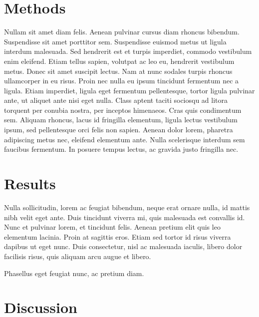\section{Methods}
\label{sec:studytwo:methods}

Nullam sit amet diam felis. Aenean pulvinar cursus diam rhoncus bibendum.
Suspendisse sit amet porttitor sem.  Suspendisse euismod metus ut ligula
interdum malesuada.  Sed hendrerit est et turpis imperdiet, commodo
vestibulum enim eleifend.  Etiam tellus sapien, volutpat ac leo eu,
hendrerit vestibulum metus.  Donec sit amet suscipit lectus.  Nam at nunc
sodales turpis rhoncus ullamcorper in eu risus.  Proin nec nulla eu ipsum
tincidunt fermentum nec a ligula.  Etiam imperdiet, ligula eget fermentum
pellentesque, tortor ligula pulvinar ante, ut aliquet ante nisi eget nulla. 
Class aptent taciti sociosqu ad litora torquent per conubia nostra, per
inceptos himenaeos.  Cras quis condimentum sem.  Aliquam rhoncus, lacus id
fringilla elementum, ligula lectus vestibulum ipsum, sed pellentesque orci
felis non sapien.  Aenean dolor lorem, pharetra adipiscing metus nec,
eleifend elementum ante.  Nulla scelerisque interdum sem faucibus fermentum. 
In posuere tempus lectus, ac gravida justo fringilla nec.

\section{Results}
\label{sec:studytwo:results}

Nulla sollicitudin, lorem ac feugiat bibendum, neque erat ornare nulla, id
mattis nibh velit eget ante.  Duis tincidunt viverra mi, quis malesuada est
convallis id.  Nunc et pulvinar lorem, et tincidunt felis.  Aenean pretium
elit quis leo elementum lacinia.  Proin at sagittis eros.  Etiam sed tortor
id risus viverra dapibus ut eget nunc.  Duis consectetur, nisl ac malesuada
iaculis, libero dolor facilisis risus, quis aliquam arcu augue et libero. 



Phasellus eget feugiat nunc, ac pretium diam.

\section{Discussion}
\label{sec:studytwo:discussion}


